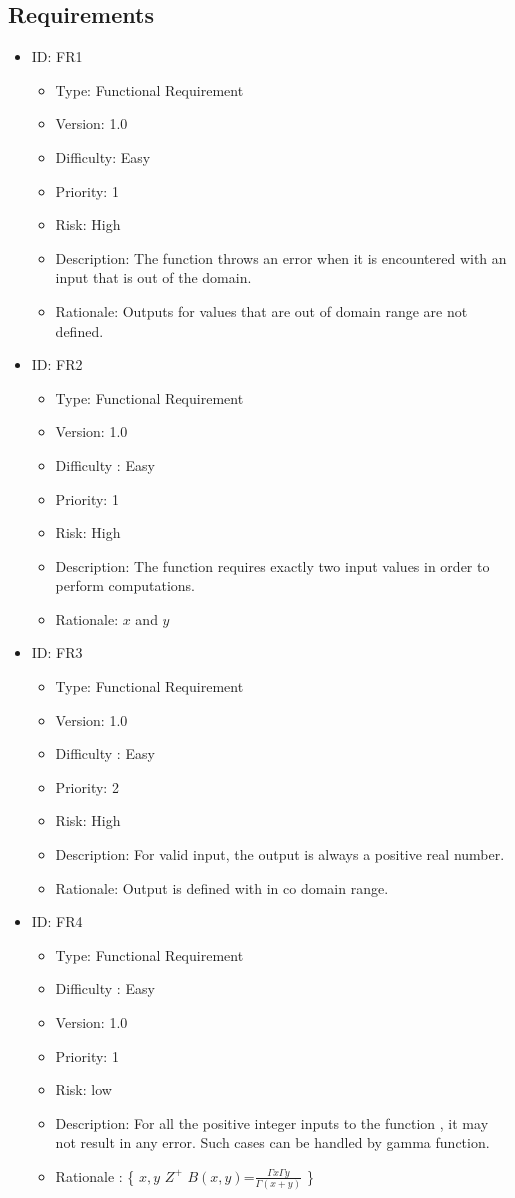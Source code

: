 \documentclass[12pt]{report}
\begin{document}
\subsection{Requirements}
\begin{itemize}
\item ID: FR1
\begin{itemize}
\item Type: Functional Requirement
\item Version:  1.0
\item Difficulty: Easy
\item Priority: 1
\item Risk: High
\item Description: The function throws an error when it is encountered with an input that is out of the domain.
\item Rationale: Outputs for values that are out of domain range are not defined.
\end{itemize}

\item ID: FR2
\begin{itemize}
\item Type: Functional Requirement
\item Version:  1.0
\item Difficulty : Easy
\item Priority: 1
\item Risk: High
\item Description: The function requires exactly two input values in order to perform computations.
\item Rationale: $x$ and $y$
\end{itemize}

\item ID: FR3
\begin{itemize}
\item Type: Functional Requirement
\item Version:  1.0
\item Difficulty : Easy
\item Priority: 2
\item Risk: High
\item Description: For valid input, the output is always a positive real number.
\item Rationale: Output is defined with in co domain range.
\end{itemize}

\item ID: FR4
\begin{itemize}
\item Type: Functional Requirement
\item Difficulty : Easy
\item Version:  1.0
\item Priority: 1
\item Risk: low
\item Description: For all the positive integer inputs to the function , it may not result in any error. Such cases can be handled by gamma function.
\item Rationale :  \{ \forall $x,y$ \in $Z^+$ \mid $B(x,y)$=$\frac{{\Gamma x} {\Gamma y}}{\Gamma (x+y)}$ \}
\end{itemize}


\end{itemize}
\end{document}
